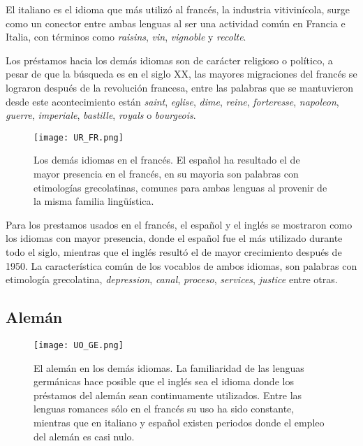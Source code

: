 El italiano es el idioma que más utilizó al francés,  la industria vitivinícola, surge como un conector entre ambas lenguas al ser una actividad común en Francia e Italia, con términos como \textit{raisins}, \textit{vin}, \textit{vignoble} y \textit{recolte}.

Los préstamos hacia los demás idiomas son de carácter religioso o político, a pesar de que la búsqueda es en el siglo XX, las mayores migraciones del francés se lograron después de la revolución francesa, entre las palabras que se mantuvieron desde este acontecimiento están  \textit{saint}, \textit{eglise}, \textit{dime}, \textit{reine}, \textit{forteresse}, \textit{napoleon}, \textit{guerre}, \textit{imperiale}, \textit{bastille}, \textit{royals} o \textit{bourgeois}.  


\begin{figure}%
	\centering
	\texttt{[image: UR\_FR.png]}
	\label{fig.ST_b_FR}
	\caption{Los demás idiomas en el francés. El español ha resultado el de mayor presencia en el francés, en su mayoria son palabras con etimologías grecolatinas, comunes para ambas lenguas al provenir de la misma familia lingüística.}
\end{figure}
		
Para los prestamos usados en el francés, el español y el inglés se mostraron como los idiomas con mayor presencia, donde el español fue el más utilizado durante todo el siglo, mientras que el inglés resultó el de mayor crecimiento después de 1950. La característica común de los vocablos de ambos idiomas, son palabras con etimología grecolatina,  \textit{depression}, \textit{canal}, \textit{proceso}, \textit{services}, \textit{justice} entre otras. 



\subsection{Alemán} %

\begin{figure}%
	\centering
	\texttt{[image: UO\_GE.png]}
	\label{fig.ST_a_GE}
	\caption{El alemán en los demás idiomas. La familiaridad de las lenguas germánicas hace posible que el inglés sea el idioma  donde los préstamos del alemán sean continuamente utilizados. Entre las lenguas romances sólo en el francés su uso ha sido constante, mientras que en italiano y español existen periodos donde el empleo del alemán es casi nulo.}

\end{figure}


